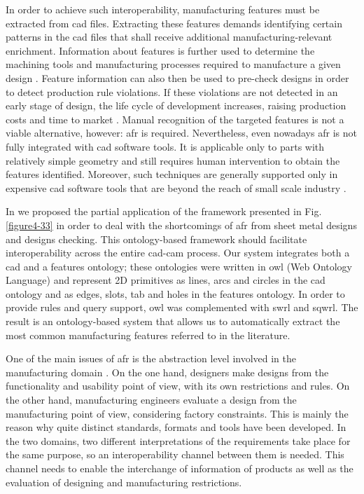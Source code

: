 In order to achieve such interoperability, manufacturing features must be extracted from \gls{cad} files.  Extracting these features demands identifying certain patterns in the \gls{cad} files that shall receive additional manufacturing-relevant enrichment.  Information about features is further used to determine the machining tools and manufacturing processes required to manufacture a given design \cite{cayiroglu_new_2009}. Feature information can also then be used to pre-check designs in order to detect production rule violations. If these violations are not detected in an early stage of design, the life cycle of development increases, raising production costs and time to market \cite{radhakrishnan_design_1996}. Manual recognition of the targeted features is not a viable alternative, however: \gls{afr} is required. Nevertheless, even nowadays \gls{afr} is not fully integrated with \gls{cad} software tools. It is applicable only to parts with relatively simple geometry and still requires human intervention to obtain the features identified. Moreover, such techniques are generally supported only in expensive \gls{cad} software tools that are beyond the reach of small scale industry \cite{kumar_trends_2005}. 


In \cite{ramos_ontology-based_2011}   we proposed the partial application of the framework presented in Fig. \ref{figure4-33} in order to deal with the shortcomings of \gls{afr} from sheet metal designs and designs checking. This ontology-based framework should facilitate interoperability across the entire \gls{cad}-\gls{cam} process. Our system integrates both a \gls{cad} and a features ontology; these ontologies were written in \gls{owl} (Web Ontology Language) and represent 2D primitives as lines, arcs and circles in the \gls{cad} ontology and as edges, slots, tab and holes in the features ontology. In order to provide rules and query support, \gls{owl} was complemented with \gls{swrl} and \gls{sqwrl}. The result is an ontology-based system that allows us to automatically extract the most common manufacturing features referred to in the literature.


One of the main issues of \gls{afr} is the abstraction level involved in the manufacturing domain \cite{shah_functional_1988}. On the one hand, designers make designs from the functionality and usability point of view, with its own restrictions and rules. On the other hand, manufacturing engineers evaluate a design from the manufacturing point of view, considering factory constraints. This is mainly the reason why quite distinct standards, formats and tools have been developed. In the two domains, two different interpretations of the requirements take place for the same purpose, so an interoperability channel between them is needed.  This channel needs to enable the interchange of information of products as well as the evaluation of designing and manufacturing restrictions. 

